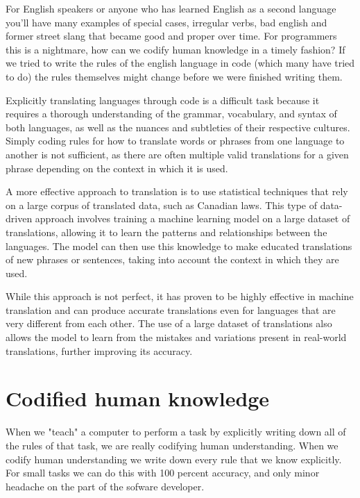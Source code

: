 For English speakers or anyone who has learned English as a second language you'll have many examples of special cases, irregular verbs, bad english and former street slang that became good and proper over time. For programmers this is a nightmare, how can we codify human knowledge in a timely fashion? If we tried to write the rules of the english language in code (which many have tried to do) the rules themselves might change before we were finished writing them.

Explicitly translating languages through code is a difficult task because it requires a thorough understanding of the grammar, vocabulary, and syntax of both languages, as well as the nuances and subtleties of their respective cultures. Simply coding rules for how to translate words or phrases from one language to another is not sufficient, as there are often multiple valid translations for a given phrase depending on the context in which it is used.

A more effective approach to translation is to use statistical techniques that rely on a large corpus of translated data, such as Canadian laws. This type of data-driven approach involves training a machine learning model on a large dataset of translations, allowing it to learn the patterns and relationships between the languages. The model can then use this knowledge to make educated translations of new phrases or sentences, taking into account the context in which they are used.

While this approach is not perfect, it has proven to be highly effective in machine translation and can produce accurate translations even for languages that are very different from each other. The use of a large dataset of translations also allows the model to learn from the mistakes and variations present in real-world translations, further improving its accuracy.

\section{Codified human knowledge}

When we "teach" a computer to perform a task by explicitly writing down all of the rules of that task, we are really codifying human understanding. When we codify human understanding we write down every rule that we know explicitly. For small tasks we can do this with 100 percent accuracy, and only minor headache on the part of the sofware developer. 


